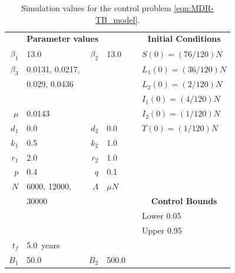 \begin{table}[H]
	\centering
	\begin{tabular}{rlrlll}
		\toprule
			& \multicolumn{2}{c}{
        \textbf{Parameter values}
        }
        &&&
        \multicolumn{1}{c}{\textbf{Initial Conditions}}
        \\
      \cmidrule{1-4}
      \cmidrule{6-6}
        $\beta_1$ 
            & \num{13.0}            
        &
        $\beta_2$ 
        & \num{13.0}
        &&
          $S(0) = (76/120)N$
          \\
        $\beta_3$ 
          & \num{0.0131}, 
            \num{0.0217},
        &&
        &&
          $L_1(0) = (36/120) N$
          \\
          & \num{0.029}, 
            \num{0.0436}
          &&&&
            $L_2(0) =(2/120) N$
        \\
          &&
          &&&
          $I_1(0) = (4/120)N$
        \\
        $\mu$ 
          & \num{0.0143}
          &&&&
          $I_2(0) = (1/120)N$
        \\
     	$d_1$ 
          & \num{0.0}
      &
      $d_2$ 
          & \num{0.0}
          &&
            $T(0)= (1/120)N$
     \\
     	$k_1$ 
      & \num{0.5}
      &
       $k_2$  
      & \num{1.0}
      \\
      $r_1$ 
      & \num{2.0}
      &
    $r_2$ 
      & \num{1.0}
      \\
    $p$
      & \num{0.4}
      &
      $q$
      & \num{0.1}
    \\
      $N$
      & 
        \num{6000}, 
        \num{12000}, 
      &
      $\Lambda$ 
      & $\mu N$
      \\
      &
      \num{30000}
      &&&&
      \multicolumn{1}{c}{\textbf{Control Bounds}}
      \\
      \cmidrule{6-6}
      &&&&&
        Lower \num{0.05}
      \\
      &&&&&
        Upper \num{0.95}
      \\
      $t_f$ 
      &
        \SI{5.0}{years}
      \\
      $B_1$ 
        & \num{50.0}
      &
      $B_2$
      & \num{500.0}
      & 
      \\
      \bottomrule
    \end{tabular}
	\caption{Simulation values for the control 
	problem \eqref{eqn:MDR-TB_model}.}
	\label{tbl:parameters_MDR-TB_model}
\end{table}

